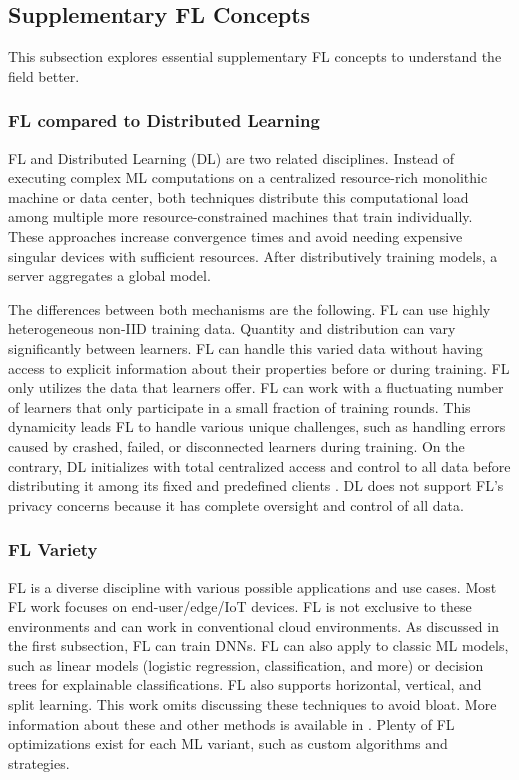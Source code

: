 \subsection{Supplementary FL Concepts}

This subsection explores essential supplementary FL concepts to understand the field better.

\subsubsection{FL compared to Distributed Learning}

FL and Distributed Learning (DL) are two related disciplines.
Instead of executing complex ML computations on a centralized resource-rich monolithic machine or data center, both techniques
distribute this computational load among multiple more resource-constrained machines that train individually.
These approaches increase convergence times and avoid needing expensive singular devices with sufficient resources.
After distributively training models, a server aggregates a global model.

The differences between both mechanisms are the following.
FL can use highly heterogeneous non-IID training data.
Quantity and distribution can vary significantly between learners.
FL can handle this varied data without having access to explicit information about their properties before or during training.
FL only utilizes the data that learners offer.
FL can work with a fluctuating number of learners that only participate in a small fraction of training rounds.
This dynamicity leads FL to handle various unique challenges, such as handling errors caused by crashed, failed, or disconnected learners during training.
On the contrary, DL initializes with total centralized access and control to all data before distributing it among its fixed and predefined clients \cite{book:fl}.
DL does not support FL's privacy concerns because it has complete oversight and control of all data.


\subsubsection{FL Variety}
FL is a diverse discipline with various possible applications and use cases.
Most FL work focuses on end-user/edge/IoT devices.
FL is not exclusive to these environments and can work in conventional cloud environments.
As discussed in the first subsection, FL can train DNNs.
FL can also apply to classic ML models, such as linear models (logistic regression, classification, and more) or decision trees for explainable classifications.
FL also supports horizontal, vertical, and split learning.
This work omits discussing these techniques to avoid bloat.
More information about these and other methods is available in \cite{book:fl}.
Plenty of FL optimizations exist for each ML variant, such as custom algorithms and strategies.

